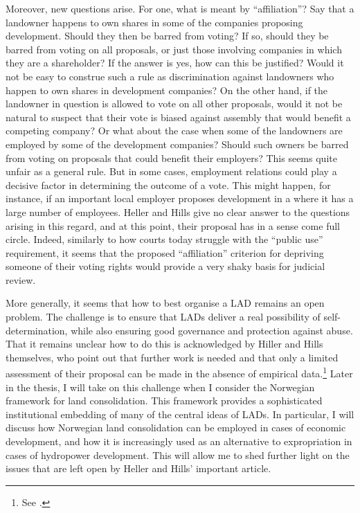 Moreover, new questions arise. For one, what is meant by ``affiliation''? Say that a landowner happens to own shares in some of the companies proposing development. Should they then be barred from voting? If so, should they be barred from voting on all proposals, or just those involving companies in which they are a shareholder? If the answer is yes, how can this be justified? Would it not be easy to construe such a rule as discrimination against landowners who happen to own shares in development companies? On the other hand, if the landowner in question is allowed to vote on all other proposals, would it not be natural to suspect that their vote is biased against assembly that would benefit a competing company? Or what about the case when some of the landowners are employed by some of the development companies? Should such owners be barred from voting on proposals that could benefit their employers? This seems quite unfair as a general rule. But in some cases, employment relations could play a decisive factor in determining the outcome of a vote. This might happen, for instance, if an important local employer proposes development in a  where it has a large number of employees. Heller and Hills give no clear answer to the questions arising in this regard, and at this point, their proposal has in a sense come full circle. Indeed, similarly to how courts today struggle with the ``public use'' requirement, it seems that the proposed ``affiliation'' criterion for depriving someone of their voting rights would provide a very shaky basis for judicial review.

More generally, it seems that how to best organise a LAD remains an open problem. The challenge is to ensure that LADs deliver a real possibility of self-determination, while also ensuring good governance and protection against abuse. That it remains unclear how to do this is acknowledged by Hiller and Hills themselves, who point out that further work is needed and that only a limited assessment of their proposal can be made in the absence of empirical data.\footnote{See \cite[]{heller08}.} Later in the thesis, I will take on this challenge when I consider the Norwegian framework for land consolidation. This framework provides a sophisticated institutional embedding of many of the central ideas of LADs. In particular, I will discuss how Norwegian land consolidation can be employed in cases of economic development, and how it is increasingly used as an alternative to expropriation in cases of hydropower development. This will allow me to shed further light on the issues that are left open by Heller and Hills' important article.

